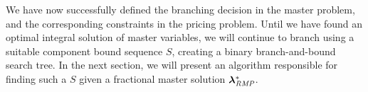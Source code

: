 We have now successfully defined the branching decision in the master problem, and the corresponding constraints in the pricing problem. Until we have found an optimal integral solution of master variables, we will continue to branch using a suitable component bound sequence $S$, creating a binary branch-and-bound search tree. In the next section, we will present an algorithm responsible for finding such a $S$ given a fractional master solution ${\bm{\lambda}}^*_{\textit{RMP}}{}$.